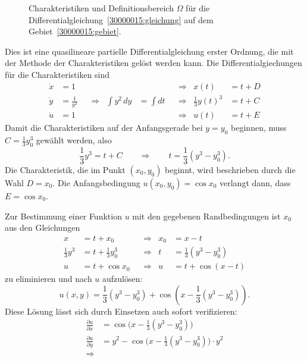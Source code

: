 \begin{loesung}
\begin{figure}
\centering
{}
\caption{Charakteristiken und Definitionsbereich $\Omega$
für die Differentialgleichung~\eqref{30000015:gleichung}
auf dem Gebiet~\eqref{30000015:gebiet}.
\label{30000015:domain}
}
\end{figure}
Dies ist eine quasilineare partielle Differentialgleichung erster Ordnung, die
mit der Methode der Charakteristiken gelöst werden kann.
Die Differentialgiechungen für die Charakteristiken sind
\[
\begin{aligned}
\dot x &= 1           &&           &              &         &&\Rightarrow& x(t) &= t + D
\\
\dot y &= \frac1{y^2} &&\Rightarrow& \int y^2\,dy &=\int dt &&\Rightarrow& \frac13 y(t)^3 &= t + C
\\
\dot u &= 1           &&           &              &         &&\Rightarrow& u(t) &= t + E
\end{aligned}
\]
Damit die Charakteristiken auf der Anfangsgerade bei $y=y_0$ beginnen, muss
$C=\frac13y_0^3$ gewählt werden, also
\[
\frac13 y^3 = t + C
\qquad\Rightarrow\qquad
t = \frac13(y^3-y_0^3).
\]
Die Charakteristik, die im Punkt $(x_0,y_0)$ beginnt, wird beschrieben durch
die Wahl $D=x_0$.
Die Anfangsbedingung $u(x_0,y_0)=\cos x_0 $
verlangt dann, dass $E=\cos x_0 $.
\begin{teilaufgaben}
\item Zur Bestimmung einer Funktion $u$ mit den gegebenen Randbedingungen
ist $x_0$ aus den Gleichungen
\[
\begin{aligned}
x           &= t + x_0          &&\Rightarrow& x_0 &= x - t              \\
{\textstyle\frac13}y^3 &= t + {\textstyle\frac13}y_0^3 &&\Rightarrow& t   &= \textstyle{\frac13}(y^3-y_0^3) \\
u           &= t + \cos x_0     &&\Rightarrow& u   &= t + \cos(x-t)
\end{aligned}
\]
zu eliminieren und nach $u$ aufzulösen:
\[
u(x,y) = 
{\textstyle \frac13}(y^3-y_0^3)
+
\cos (x-{\textstyle \frac13}(y^3-y_0^3)).
\]
Diese Lösung lässt sich durch Einsetzen auch sofort verifizieren:
\begin{align*}
\frac{\partial u}{\partial x}
&=
\cos\bigl(x-{\textstyle\frac13}(y^3-y_0^3)\bigr)
\\
\frac{\partial u}{\partial y}
&=
y^2 -
\cos\bigl(x-{\textstyle\frac13}(y^3-y_0^3)\bigr)
\cdot y^2
\\
\Rightarrow

\end{align*}
\end{teilaufgaben}
\end{loesung}
